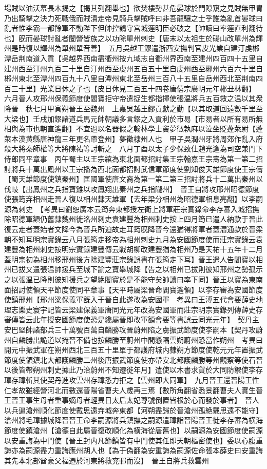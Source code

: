 場賊以油沃幕長木揭之【揭其列翻舉也】欲焚樓勢甚危晏球於門隙窺之見賊無甲胄乃出騎擊之決力死戰俄而賊潰走帝見騎兵擊賊呼曰非吾龍驤之士乎誰為亂首晏球曰亂者惟李霸一都餘軍不動陛下但帥控鶴守宫城遲明臣必破之【帥讀曰率遲直利翻待也】旣而晏球討亂者闔營皆族之以功除單州刺史【唐末以太祖生於碭山改單州為輝州是時復以輝州為單州單音善】　五月吳越王鏐遣浙西安撫判官皮光業自建汀虔郴潭岳荆南道入貢【吳越界西南盡衢州按九域志自衢州界西南至建州四百四十五里自建州西至汀州九百三十里自汀州西至虔州五百五十里自虔州西至郴州六百六十里自郴州東北至潭州四百九十八里自潭州東北至岳州三百八十五里自岳州西北至荆南四百三十里】光業日休之子也【皮日休見二百五十四卷唐僖宗廣明元年郴丑林翻】　六月晉人攻邢州保義節度使閻寶拒守帝遣捉生都指揮使張温將兵五百救之温以其衆降晉　秋七月甲寅朔晉王至魏州　上嘉吳越王鏐貢獻之勤【以其取道回遠數千里至大梁也】壬戌加鏐諸道兵馬元帥朝議多言鏐之入貢利於市易【市易者以所有易所無相與為市也朝直遙翻】不宜過以名器假之翰林學士竇夢徵執麻以泣坐貶蓬萊尉【蓬萊本漢黄縣唐神龍三年更名帶登州】夢徵棣州人也　甲子吳潤州牙將周郊作亂入府殺大將秦師權等大將陳祐等討斬之　八月丁酉以太子少保致仕趙光逢為司空兼門下侍郎同平章事　丙午蜀主以王宗綰為東北面都招討集王宗翰嘉王宗壽為第一第二招討將兵十萬出鳳州以王宗播為西北面都招討武信軍節度使劉知俊天雄節度使王宗儔【蜀天雄節度使鎮秦州】匡國軍使唐文裔為第一第二第三招討將兵十二萬出秦州以伐岐【出鳳州之兵指寶雞以攻鳳翔出秦州之兵指隴州】　晉王自將攻邢州昭德節度使張筠弃相州走晉人復以相州隸天雄軍【去年梁分相州為昭德軍相息亮翻】以李嗣源為刺史　【考異曰劉恕廣本云筠奔東都授左衛上將軍莊宗實錄命李存審入城招撫除昭德軍額仍舊隸魏州徙洺州刺史袁建豐為相州刺史按上四月筠已遣人納款于晉此復云走者蓋始者文降今為晉兵所迫故走耳筠旣降晉今還猶得將軍者蓋濳通款於晉梁朝不知耳明宗實錄云八月張筠走移帝為相州刺史九月為安國節度使而莊宗實錄云袁建豐為相州刺史按明宗實錄建豐傳云戰胡柳改建豐猶為相州乃是天祐十五年十二月蓋明宗初為相州移邢州後方除建豐莊宗錄誤書在張筠走下耳】晉王遣人告閻寶以相州已拔又遣張温帥援兵至城下諭之寶舉城降【告之以相州已拔則彼知邢州之勢孤示之以張温已降則彼知援兵之望絶閻寶於是不能守矣帥讀曰率下同】晉王以寶為東南面招討使領天平節度使同平章事【天平時屬梁晉命閻寶遙領】以李存審為安國節度使鎮邢州【邢州梁保義軍旣入于晉自此遂改為安國軍　考異曰王溥五代會要薛史地理志樂史寰宇記皆云梁建保義軍唐同光元年改為安國軍而莊宗明宗實錄列傳薛史存審傳皆云此年授安國節度使恐是纔屬晉即改軍額會要等書誤云同光元年】　契丹主安巴堅帥諸部兵三十萬號百萬自麟勝攻晉蔚州陷之虜振武節度使李嗣本【契丹攻蔚州自麟勝出詭道以掩晉不備也按麟勝至蔚州中間懸隔雲朔蔚州恐當作朔州　考異曰開元中振武軍在朔州西北三百五十里單于都護府城内隸朔方節度使乾元元年置振武節度使領鎮北大都護麟勝二州後唐振武節度使亦帶安北都護麟勝等州觀察等使石晉以後皆帶朔州刺史據此乃治蔚州不知遷徙年月】遣使以木書求貨於大同防禦使李存璋存璋斬其使契丹進攻雲州存璋悉力拒之【雲州即大同軍】　九月晉王還晉陽王性仁孝故雖經營河北而數還晉陽省曹夫人歲再三焉【數所角翻省悉景翻曹夫人實生晉王晉王事生母者重事嫡母者輕異日太后太妃尊號倒置皆根於心而發於事者】　晉人以兵逼滄州順化節度使戴思遠弃城奔東都【河朔盡歸於晉滄州孤絶戴思遠不能守】滄州將毛璋據城降晉晉王命李嗣源將兵鎮撫之嗣源遣璋詣晉陽晉王徙李存審為横海節度使鎮滄州【滄德自此屬晉復改順化為横海從唐舊也】以嗣源為安國節度使嗣源以安重誨為中門使【晉王封内凡節鎮皆有中門使其任即天朝樞密使也】委以心腹重誨亦為嗣源盡力重誨應州胡人也【為于偽翻為安重誨為嗣源佐命張本薛史曰安重誨其先本北部酋豪父福遷於河東將救兖鄆而沒】　晉王自將兵救雲州